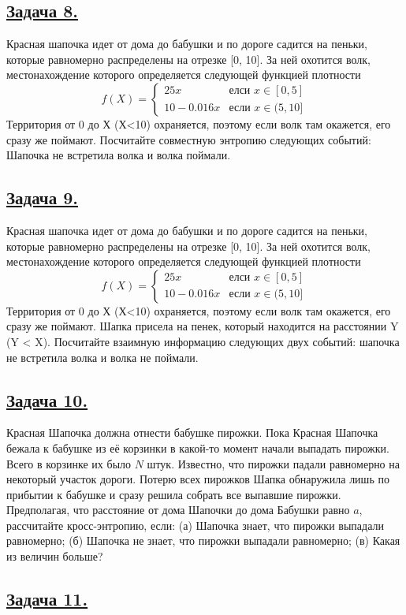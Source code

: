 \subsection*{\hyperref[sec:sol_problem8]{Задача 8.}}\label{sec:problem8} Красная шапочка идет от дома до бабушки и по дороге садится на пеньки, которые равномерно распределены на отрезке [0, 10]. За ней охотится волк, местонахождение которого определяется следующей функцией плотности 
\begin{equation*}
f(X) = 
 \begin{cases}
   25x &\text{елси $x \in [0, 5]$}\\
   10 - 0.016x &\text{если $x \in (5, 10]$}
 \end{cases}
\end{equation*}
Территория от 0 до Х (Х<10) охраняется, поэтому если волк там окажется, его сразу же поймают. Посчитайте совместную энтропию следующих событий: Шапочка не встретила волка и волка поймали. 

\subsection*{\hyperref[sec:sol_problem9]{Задача 9.}}\label{sec:problem9} Красная шапочка идет от дома до бабушки и по дороге садится на пеньки, которые равномерно распределены на отрезке [0, 10]. За ней охотится волк, местонахождение которого определяется следующей функцией плотности
\begin{equation*}
f(X) = 
 \begin{cases}
   25x &\text{елси $x \in [0, 5]$}\\
   10 - 0.016x &\text{если $x \in (5, 10]$}
 \end{cases}
\end{equation*}
Территория от 0 до Х (Х<10) охраняется, поэтому если волк там окажется, его сразу же поймают. Шапка присела на пенек, который находится на расстоянии Y (Y < X). Посчитайте взаимную информацию следующих двух событий: шапочка не встретила волка и волка не поймали. 
 
\subsection*{\hyperref[sec:sol_problem10]{Задача 10.}}\label{sec:problem10} Красная Шапочка должна отнести бабушке пирожки. Пока Красная Шапочка бежала к бабушке из её корзинки в какой-то момент начали выпадать пирожки. Всего в корзинке их было $N$ штук. Известно, что пирожки падали равномерно на некоторый участок дороги. Потерю всех пирожков Шапка обнаружила лишь по прибытии к бабушке и сразу решила собрать все выпавшие пирожки. Предполагая, что расстояние от дома Шапочки до дома Бабушки равно $a$, рассчитайте кросс-энтропию, если:
(а) Шапочка знает, что пирожки выпадали равномерно;
(б) Шапочка не знает, что пирожки выпадали равномерно;
(в) Какая из величин больше?

\subsection*{\hyperref[sec:sol_problem11]{Задача 11.}}\label{sec:problem11}
